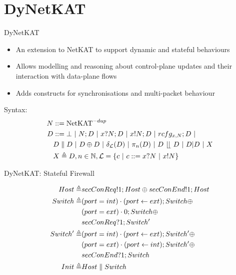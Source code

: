 \section{DyNetKAT}

\begin{frame}{DyNetKAT}
    \begin{itemize}
        \item An extension to NetKAT to support dynamic and stateful behaviours
        \item Allows modelling and reasoning
              about control-plane updates and their interaction with data-plane flows
        \item Adds constructs for synchronisations and multi-packet behaviour
    \end{itemize}
    Syntax:
    \begin{align*}
        N & :: = \mathrm{NetKAT}^{-dup}                                 \\
        D & :: = \bot ~|~ N;D ~|~ x?N;D ~|~ x!N;D ~|~ rcfg_{x,N};D  ~|~ \\
          & D\parallel D ~|~ D \oplus D ~|~ \delta_{\mathcal{L}}(D)
        ~|~ \pi_n(D) ~|~ D ~\lfloor \! \lfloor~ D ~|~ D | D ~|~ X                        \\
          & X \triangleq D, n \in \mathbb{N},
        \mathcal{L} = \{c ~|~ c ::= x?N ~|~ x!N\}
    \end{align*}
\end{frame}

\begin{frame}{DyNetKAT: Stateful Firewall}
    \begin{figure}
        \centering
    \end{figure}
    \begin{align*}
        Host  \triangleq   & secConReq!1;Host \oplus secConEnd!1;Host        \\
        Switch \triangleq  & (port = int) \cdot (port \leftarrow ext);Switch \oplus \\
                           & (port = ext)\cdot 0 ; Switch \oplus             \\
                           & secConReq?1;Switch'                             \\
        Switch' \triangleq & (port =int) \cdot (port \leftarrow ext);Switch' \oplus \\
                           & (port=ext)\cdot(port\leftarrow int);Switch' \oplus     \\
                           & secConEnd?1;Switch                              \\
        Init \triangleq    & Host \parallel Switch
    \end{align*}
\end{frame}
